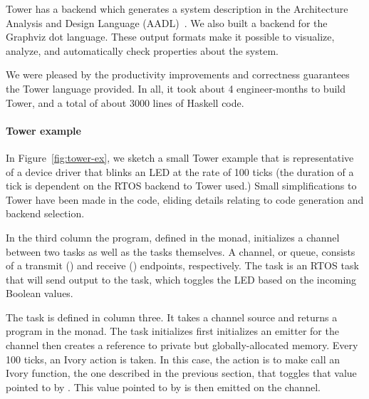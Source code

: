 Tower has a backend which generates a system description in the Architecture
Analysis and Design Language (AADL)~\cite{SAE:AADL}. We also built a backend for
the Graphviz dot language.  These output formats make it possible to visualize,
analyze, and automatically check properties about the system.  %

We were pleased by the productivity improvements and correctness guarantees the
Tower language provided. In all, it took about 4 engineer-months to build Tower,
and a total of about 3000 lines of Haskell code.

\paragraph{Tower example}
In Figure~\ref{fig:tower-ex}, we sketch a small Tower example that is
representative of a device driver that blinks an LED at the rate of 100 ticks
(the duration of a tick is dependent on the RTOS backend to Tower used.)  Small
simplifications to Tower have been made in the code, eliding details relating to
code generation and backend selection.

In the third column the program, defined in the  monad, initializes a
channel between two tasks as well as the tasks themselves.  A channel, or queue,
consists of a transmit () and receive () endpoints, respectively.
The  task is an RTOS task that will send output to the
 task, which toggles the LED based on the incoming Boolean
values.

The  task is defined in column three.  It takes a channel source and
returns a program in the  monad.  The task initializes first
initializes an emitter for the channel then creates a reference to private but
globally-allocated memory.  Every 100 ticks, an Ivory action is taken.  In this
case, the action is to make call an Ivory function, the one described in the
previous section, that toggles that value pointed to by .  This value
pointed to by  is then emitted on the channel.




